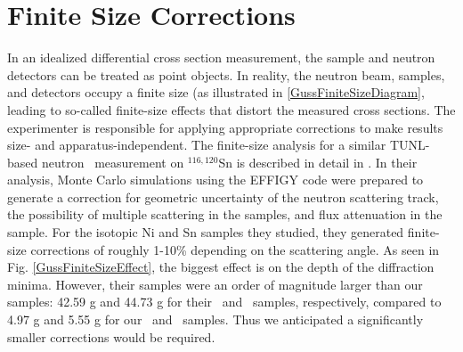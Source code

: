 \section{Finite Size Corrections}
In an idealized differential cross section measurement, the sample and neutron
detectors can be treated as point objects. In reality, the neutron beam,
samples, and detectors occupy a finite size (as illustrated in \ref{GussFiniteSizeDiagram},
leading to so-called finite-size effects that distort the measured cross sections.
The experimenter is responsible
for applying appropriate corrections to make results size- and
apparatus-independent. The finite-size analysis for
a similar TUNL-based neutron \el\ measurement on $^{116,120}$Sn is described in detail
in \cite{GussPhDThesis}. In their analysis, Monte Carlo simulations using the
EFFIGY code were
prepared to generate a correction for geometric uncertainty of the neutron
scattering track, the possibility of multiple scattering
in the samples, and flux attenuation in the sample.
For the isotopic Ni and Sn samples they studied, they generated finite-size
corrections of roughly 1-10\% depending on the scattering angle. As seen in
Fig. \ref{GussFiniteSizeEffect}, the
biggest effect is on the depth of the diffraction minima.
However, their samples
were an order of magnitude larger than our
samples: 42.59 g and 44.73 g for their \snSixteen\ and \snTwenty\ samples,
respectively, compared to 4.97 g and 5.55 g for our \snTwelve\ and \snFour\
samples. Thus we anticipated a significantly smaller corrections would be
required.

